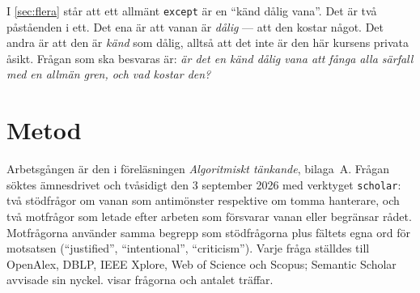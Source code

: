 I \cref{sec:flera} står att ett allmänt \texttt{except} är en
\enquote{känd dålig vana}.  Det är två påståenden i ett.  Det ena är att
vanan är \emph{dålig} --- att den kostar något.  Det andra är att den är
\emph{känd} som dålig, alltså att det inte är den här kursens privata
åsikt.  Frågan som ska besvaras är: \emph{är det en känd dålig vana att
fånga alla särfall med en allmän gren, och vad kostar den?}

\section{Metod}
\label{sec:ca-metod}

Arbetsgången är den i föreläsningen \emph{Algoritmiskt tänkande},
bilaga~A.  Frågan söktes ämnesdrivet
och tvåsidigt den 3 september 2026 med verktyget \texttt{scholar}: två
stödfrågor om vanan som antimönster respektive om tomma hanterare, och
två motfrågor som letade efter arbeten som försvarar vanan eller
begränsar rådet.  Motfrågorna använder samma begrepp som stödfrågorna
plus fältets egna ord för motsatsen (\enquote{justified},
\enquote{intentional}, \enquote{criticism}).  Varje fråga ställdes till
OpenAlex, DBLP, IEEE Xplore, Web of Science och Scopus; Semantic Scholar
avvisade sin nyckel.   visar frågorna och antalet
träffar.

